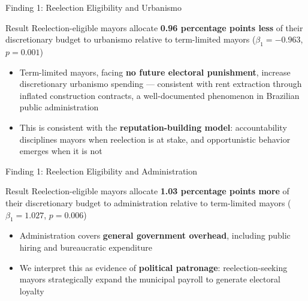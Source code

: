 \documentclass{beamer}
\begin{document}
\begin{frame}{Finding 1: Reelection Eligibility and Urbanismo}
\begin{block}{Result}
Reelection-eligible mayors allocate \textbf{0.96 percentage points less} of their discretionary budget to urbanismo relative to term-limited mayors ($\beta_1 = -0.963$, $p = 0.001$)
\end{block}
\vspace{1em}
\begin{itemize}
    \item Term-limited mayors, facing \textbf{no future electoral punishment}, increase discretionary urbanismo spending --- consistent with rent extraction through inflated construction contracts, a well-documented phenomenon in Brazilian public administration
    \vspace{1em}
    \item This is consistent with the \textbf{reputation-building model}: accountability disciplines mayors when reelection is at stake, and opportunistic behavior emerges when it is not
\end{itemize}
\end{frame}

\begin{frame}{Finding 1: Reelection Eligibility and Administration}
\begin{block}{Result}
Reelection-eligible mayors allocate \textbf{1.03 percentage points more} of their discretionary budget to administration relative to term-limited mayors ($\beta_1 = 1.027$, $p = 0.006$)
\end{block}
\vspace{1em}
\begin{itemize}
    \item Administration covers \textbf{general government overhead}, including public hiring and bureaucratic expenditure
    \vspace{1em}
    \item We interpret this as evidence of \textbf{political patronage}: reelection-seeking mayors strategically expand the municipal payroll to generate electoral loyalty
\end{itemize}
\end{frame}
\end{document}
